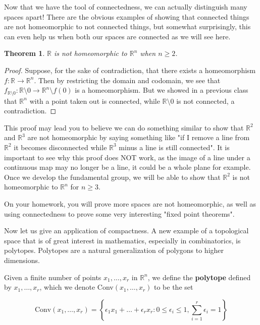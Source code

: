 \documentclass[a4paper]{article}
\newtheorem{theorem}{Theorem}
\numberwithin{theorem}{section}
\begin{document}
Now that we have the tool of connectedness, we can actually distinguish many spaces apart! There are the obvious examples of showing that connected things are not homeomorphic to not connected things, but somewhat surprisingly, this can even help us when both our spaces are connected as we will see here.

\begin{theorem}
$\mathbb{R}$ is not homeomorphic to $\mathbb{R}^n$ when $n \geq 2$.
\end{theorem}

\begin{proof}
Suppose, for the sake of contradiction, that there exists a homeomorphism $f: \mathbb{R} \rightarrow \mathbb{R}^n$. Then by restricting the domain and codomain, we see that $f_{\mathbb{R}\setminus 0}: \mathbb{R} \setminus 0 \rightarrow \mathbb{R}^n \setminus f(0)$ is a homeomorphism. But we showed in a previous class that $\mathbb{R}^n$ with a point taken out is connected, while $\mathbb{R} \setminus 0$ is not connected, a contradiction.
\end{proof}

This proof may lead you to believe we can do something similar to show that $\mathbb{R}^2$ and $\mathbb{R}^3$ are not homeomorphic by saying something like "if I remove a line from $\mathbb{R}^2$ it becomes disconnected while $\mathbb{R}^3$ minus a line is still connected". It is important to see why this proof does NOT work, as the image of a line under a continuous map may no longer be a line, it could be a whole plane for example. Once we develop the fundamental group, we will be able to show that $\mathbb{R}^2$ is not homeomorphic to $\mathbb{R}^n$ for $n \geq 3$.

On your homework, you will prove more spaces are not homeomorphic, as well as using connectedness to prove some very interesting "fixed point theorems".

Now let us give an application of compactness. A new example of a topological space that is of great interest in mathematics, especially in combinatorics, is polytopes. Polytopes are a natural generalization of polygons to higher dimensions.

Given a finite number of points $x_1,\dots,x_r$ in $\mathbb{R}^n$, we define the \textbf{polytope} defined by $x_1,\dots,x_r$, which we denote Conv$(x_1,\dots, x_r)$ to be the set

$$ \text{Conv}(x_1,\dots,x_r) = \left\{\epsilon_1 x_1 + \dots + \epsilon_r x_r : 0 \leq \epsilon_i \leq 1, \sum_{i=1}^r \epsilon_i = 1 \right\}$$
\end{document}
